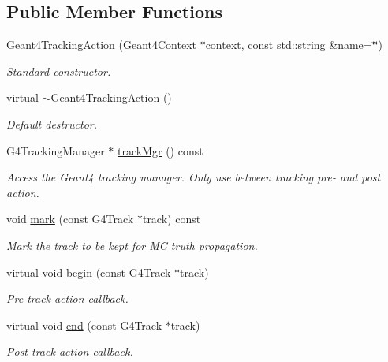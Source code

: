 \subsection*{Public Member Functions}
\begin{DoxyCompactItemize}
\item 
\hyperlink{class_d_d4hep_1_1_simulation_1_1_geant4_tracking_action_acd09cd5c45e3907040262a5a5907b0b9}{Geant4TrackingAction} (\hyperlink{class_d_d4hep_1_1_simulation_1_1_geant4_context}{Geant4Context} $\ast$context, const std::string \&name=\char`\"{}\char`\"{})
\begin{DoxyCompactList}\small\item\em Standard constructor. \item\end{DoxyCompactList}\item 
virtual \hyperlink{class_d_d4hep_1_1_simulation_1_1_geant4_tracking_action_a2647e6b8f311448fa99c20c487df3782}{$\sim$Geant4TrackingAction} ()
\begin{DoxyCompactList}\small\item\em Default destructor. \item\end{DoxyCompactList}\item 
G4TrackingManager $\ast$ \hyperlink{class_d_d4hep_1_1_simulation_1_1_geant4_tracking_action_af4da71cb09509d4c7598c22f2b725e24}{trackMgr} () const 
\begin{DoxyCompactList}\small\item\em Access the Geant4 tracking manager. Only use between tracking pre-\/ and post action. \item\end{DoxyCompactList}\item 
void \hyperlink{class_d_d4hep_1_1_simulation_1_1_geant4_tracking_action_a4f079e43bef8d199948f964ea6a64691}{mark} (const G4Track $\ast$track) const 
\begin{DoxyCompactList}\small\item\em Mark the track to be kept for MC truth propagation. \item\end{DoxyCompactList}\item 
virtual void \hyperlink{class_d_d4hep_1_1_simulation_1_1_geant4_tracking_action_a65858867a7b71bf4f48b9f140bc9a88d}{begin} (const G4Track $\ast$track)
\begin{DoxyCompactList}\small\item\em Pre-\/track action callback. \item\end{DoxyCompactList}\item 
virtual void \hyperlink{class_d_d4hep_1_1_simulation_1_1_geant4_tracking_action_a29f980c180576781771ea325b4a73f14}{end} (const G4Track $\ast$track)
\begin{DoxyCompactList}\small\item\em Post-\/track action callback. \item\end{DoxyCompactList}\end{DoxyCompactItemize}


